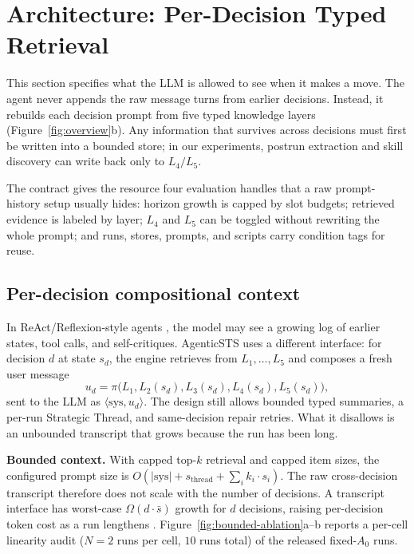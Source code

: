 \section{Architecture: Per-Decision Typed Retrieval}
\label{sec:arch}

This section specifies what the LLM is allowed to see when it makes
a move. The agent never appends the raw message turns from earlier
decisions. Instead, it rebuilds each decision prompt from five typed
knowledge layers (Figure~\ref{fig:overview}b). Any information that
survives across decisions must first be written into a bounded store;
in our experiments, postrun extraction and skill discovery can write
back only to $L_4/L_5$.

The contract gives the resource four evaluation handles that a raw
prompt-history setup usually hides: horizon growth is capped by
slot budgets; retrieved evidence is labeled by layer; $L_4$ and
$L_5$ can be toggled without rewriting the whole prompt; and runs,
stores, prompts, and scripts carry condition tags for reuse.

\subsection{Per-decision compositional context}
\label{sec:arch:bounded}

In ReAct/Reflexion-style agents \citep{react2023,reflexion2023}, the
model may see a growing log of earlier states, tool calls, and
self-critiques. AgenticSTS uses a different interface: for
decision $d$ at state $s_d$, the engine retrieves from
$L_1,\ldots,L_5$ and composes a fresh user message
\begin{equation}
u_d = \pi\bigl(L_1, L_2(s_d), L_3(s_d), L_4(s_d), L_5(s_d)\bigr),
\label{eq:composition}
\end{equation}
sent to the LLM as $\langle\mathrm{sys},u_d\rangle$. The design still
allows bounded typed summaries, a per-run Strategic Thread, and
same-decision repair retries. What it disallows is an unbounded
transcript that grows because the run has been long.

\textbf{Bounded context.} With capped top-$k$ retrieval and capped
item sizes, the configured prompt size is
$O(|\mathrm{sys}| + s_{\mathrm{thread}} + \sum_i k_i\cdot s_i)$.
The raw cross-decision transcript therefore does not scale with the
number of decisions. A transcript interface has worst-case
$\Omega(d\cdot \bar{s})$ growth for $d$ decisions, raising
per-decision token cost as a run lengthens \citep{lumer-cache-2026}. Figure~\ref{fig:bounded-ablation}a--b reports a per-cell linearity audit
($N{=}2$ runs per cell, $10$ runs total) of the released fixed-$A_0$ runs.


